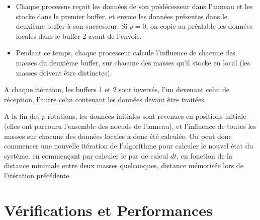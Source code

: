 \documentclass[a4paper,11pt]{article}
\begin{document}
\begin{itemize}
\item Chaque processus reçoit les données de son prédécesseur dans l'anneau et les stocke dans le premier buffer, et envoie les données présentes dans le deuxième buffer à son successeur. Si $p = 0$, on copie au préalable les données locales dans le buffer 2 avant de l'envoie.
\item Pendant ce temps, chaque processeur calcule l'influence de chacune des masses du deuxième buffer, sur chacune des masses qu'il stocke en local (les masses doivent être distinctes).
\end{itemize}
 A chaque itération, les buffers 1 et 2 sont inversés, l'un devenant celui de réception, l'autre celui contenant les données devant être traitées.

  A la fin des $p$ rotations, les données initiales sont revenues en positions initiale (elles ont parcouru l'ensemble des noeuds de l'anneau), et l'influence de toutes les masses sur chacune des données locales a donc été calculée.
 On peut donc commencer une nouvelle itération de l'algorithme pour calculer le nouvel état du système. en commençant par calculer le pas de calcul $dt$, en fonction de la distance minimale entre deux masses quelconques, distance mémorisée lors de l'itération précédente.
 
 

\section{Vérifications et Performances}
\end{document}
